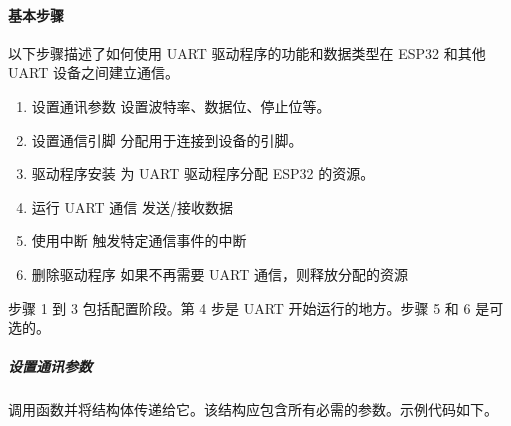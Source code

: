 \documentclass[a4paper,12pt,english]{sphinxmanual}
\begin{document}
{{\paragraph{基本步骤}
\label{\detokenize{exp-esp32/peripherals/uart:id2}}
\sphinxAtStartPar
以下步骤描述了如何使用 UART 驱动程序的功能和数据类型在 ESP32 和其他 UART 设备之间建立通信。
\begin{enumerate}
%
\item {} 
\sphinxAtStartPar
设置通讯参数\sphinxhyphen{} 设置波特率、数据位、停止位等。

\item {} 
\sphinxAtStartPar
设置通信引脚\sphinxhyphen{} 分配用于连接到设备的引脚。

\item {} 
\sphinxAtStartPar
驱动程序安装\sphinxhyphen{} 为 UART 驱动程序分配 ESP32 的资源。

\item {} 
\sphinxAtStartPar
运行 UART 通信\sphinxhyphen{} 发送/接收数据

\item {} 
\sphinxAtStartPar
使用中断\sphinxhyphen{} 触发特定通信事件的中断

\item {} 
\sphinxAtStartPar
删除驱动程序\sphinxhyphen{} 如果不再需要 UART 通信，则释放分配的资源

\end{enumerate}

\sphinxAtStartPar
步骤 1 到 3 包括配置阶段。第 4 步是 UART 开始运行的地方。步骤 5 和 6 是可选的。


\subparagraph{设置通讯参数}
\label{\detokenize{exp-esp32/peripherals/uart:id3}}
\sphinxAtStartPar
调用函数并将结构体传递给它。该结构应包含所有必需的参数。示例代码如下。

\begin{sphinxVerbatim}[commandchars=\\\{\}]


\end{sphinxVerbatim}}}
\end{document}
